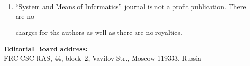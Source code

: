 {{\begin{enumerate}[1.]
\begin{itemize}
\item the article title, authors' names, and the journal title, whereto the paper is being submitted, in the text of the e-mail;\\[-13.5pt]


\item   an article and additional materials have to be attached using the ``attach'' function;\\[-13.5pt]


\item   an electronic version of the article should contain the file with the text and a~separate file


with figures.\\[-14pt]


\end{itemize}





\item ``System and Means of Informatics'' journal is not a profit publication. There are no


charges for the authors as well as there are no royalties.\\[-13.5pt]


\end{enumerate}





















\begin{center}


\textbf{Editorial Board address:} \\











FRC CSC RAS, 44, block~2, Vavilov Str., Moscow 119333, Russia \\[-8pt]





\






\end{center}}}
